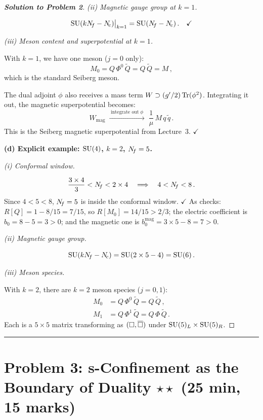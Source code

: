 \documentclass[11pt,a4paper]{article}
\begin{document}
\begin{proof}[\textbf{Solution to Problem 2}]
\textit{(ii) Magnetic gauge group at $k = 1$.}

\[
  \mathrm{SU}(kN_{\!f} - N_{\!c})\big|_{k=1} = \mathrm{SU}(N_{\!f} - N_{\!c})\,.
  \quad\checkmark
\]

\textit{(iii) Meson content and superpotential at $k = 1$.}

With $k = 1$, we have one meson ($j = 0$ only):
\[
  M_0 = Q\,\Phi^0\,\widetilde{Q} = Q\,\widetilde{Q} = M\,,
\]
which is the standard Seiberg meson.

The dual adjoint $\phi$ also receives a mass term
$W \supset (g'/2)\,\mathrm{Tr}(\phi^2)$.  Integrating it out, the magnetic
superpotential becomes:
\[
  W_{\text{mag}}
  \;\xrightarrow{\;\text{integrate out}\;\phi\;}
  \;\frac{1}{\mu}\, M\, q\, \widetilde{q}\,.
\]
This is the Seiberg magnetic superpotential from Lecture~3.
\quad$\checkmark$

\bigskip

\textbf{(d) Explicit example: $\mathrm{SU}(4)$, $k = 2$, $N_{\!f} = 5$.}

\textit{(i) Conformal window.}

\[
  \frac{3 \times 4}{3} < N_{\!f} < 2 \times 4
  \quad\Longrightarrow\quad
  4 < N_{\!f} < 8\,.
\]
Since $4 < 5 < 8$, $N_{\!f} = 5$ is inside the conformal window.
\quad$\checkmark$
As checks: $R[Q] = 1 - 8/15 = 7/15$, so $R[M_0] = 14/15 > 2/3$; the
electric coefficient is $b_0 = 8 - 5 = 3 > 0$; and the magnetic one is
$b_0^{\text{mag}} = 3 \times 5 - 8 = 7 > 0$.

\textit{(ii) Magnetic gauge group.}

\[
  \mathrm{SU}(kN_{\!f} - N_{\!c}) = \mathrm{SU}(2 \times 5 - 4) = \mathrm{SU}(6)\,.
\]

\textit{(iii) Meson species.}

With $k = 2$, there are $k = 2$ meson species ($j = 0, 1$):
\begin{align*}
  M_0 &= Q\,\Phi^0\,\widetilde{Q} = Q\,\widetilde{Q}\,,\\
  M_1 &= Q\,\Phi^1\,\widetilde{Q} = Q\,\Phi\,\widetilde{Q}\,.
\end{align*}
Each is a $5 \times 5$ matrix transforming as
$(\square, \overline{\square})$ under $\mathrm{SU}(5)_L \times \mathrm{SU}(5)_R$.

\end{proof}


\bigskip
\hrule
\bigskip


\section*{Problem 3: s-Confinement as the Boundary of Duality
  \hfill $\star\star$ \normalsize(25 min, 15 marks)}
\label{prob:s-confinement}
\end{document}
